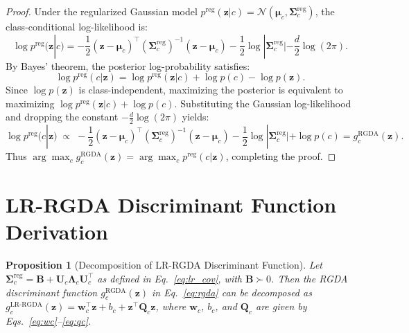 \documentclass{article}
\newtheorem{proposition}[theorem]{Proposition}
\begin{document}
\begin{proof}
Under the regularized Gaussian model $p^{\text{reg}}(\mathbf{z}|c) = \mathcal{N}(\boldsymbol{\mu}_c, \mathbf{\Sigma}_c^{\text{reg}})$, the class-conditional log-likelihood is:
\begin{equation}
    \log p^{\text{reg}}(\mathbf{z}|c) = -\frac{1}{2}(\mathbf{z} - \boldsymbol{\mu}_c)^\top (\mathbf{\Sigma}_c^{\text{reg}})^{-1} (\mathbf{z} - \boldsymbol{\mu}_c) - \frac{1}{2}\log|\mathbf{\Sigma}_c^{\text{reg}}| - \frac{d}{2}\log(2\pi).
\end{equation}
By Bayes' theorem, the posterior log-probability satisfies:
\begin{equation}
    \log p^{\text{reg}}(c|\mathbf{z}) = \log p^{\text{reg}}(\mathbf{z}|c) + \log p(c) - \log p(\mathbf{z}).
\end{equation}
Since $\log p(\mathbf{z})$ is class-independent, maximizing the posterior is equivalent to maximizing $\log p^{\text{reg}}(\mathbf{z}|c) + \log p(c)$. Substituting the Gaussian log-likelihood and dropping the constant $-\frac{d}{2}\log(2\pi)$ yields:
\begin{equation}
    \log p^{\text{reg}}(c|\mathbf{z}) \;\propto\; -\frac{1}{2}(\mathbf{z} - \boldsymbol{\mu}_c)^\top (\mathbf{\Sigma}_c^{\text{reg}})^{-1} (\mathbf{z} - \boldsymbol{\mu}_c) - \frac{1}{2}\log|\mathbf{\Sigma}_c^{\text{reg}}| + \log p(c) = g_c^{\text{RGDA}}(\mathbf{z}).
\end{equation}
Thus $\arg\max_{c} g_c^{\text{RGDA}}(\mathbf{z}) = \arg\max_{c} p^{\text{reg}}(c|\mathbf{z})$, completing the proof.
\end{proof}

\section{LR-RGDA Discriminant Function Derivation}
\label{app:lr_rgda_derivation}

\begin{proposition}[Decomposition of LR-RGDA Discriminant Function]
\label{prop:decomposition}
Let $\mathbf{\Sigma}_c^{\text{reg}} = \mathbf{B} + \mathbf{U}_c \boldsymbol{\Lambda}_c \mathbf{U}_c^\top$ as defined in Eq.~\eqref{eq:lr_cov}, with $\mathbf{B} \succ 0$. Then the RGDA discriminant function $g_c^{\text{RGDA}}(\mathbf{z})$ in Eq.~\eqref{eq:rgda} can be decomposed as $g_c^{\text{LR-RGDA}}(\mathbf{z}) = \mathbf{w}_c^\top \mathbf{z} + b_c + \mathbf{z}^\top \mathbf{Q}_c \mathbf{z}$, where $\mathbf{w}_c$, $b_c$, and $\mathbf{Q}_c$ are given by Eqs.~\eqref{eq:wc}--\eqref{eq:qc}.
\end{proposition}
\end{document}
